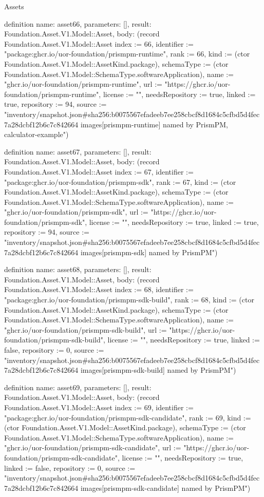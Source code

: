 \begin{lexlean}{Assets}
\begin{semanticmodule}
definition{
  name: asset66,
  parameters: [],
  result: Foundation.Asset.V1.Model::Asset,
  body: (record Foundation.Asset.V1.Model::Asset {index := 66, identifier := "package:ghcr.io/uor-foundation/prismpm-runtime", rank := 66, kind := (ctor Foundation.Asset.V1.Model::AssetKind.package), schemaType := (ctor Foundation.Asset.V1.Model::SchemaType.softwareApplication), name := "ghcr.io/uor-foundation/prismpm-runtime", url := "https://ghcr.io/uor-foundation/prismpm-runtime", license := "", needsRepository := true, linked := true, repository := 94, source := "inventory/snapshot.json#sha256:b0075567efadeeb7ee258cbcf8d1684c5cfbd5d4fec7a28dcbf12b6c7c842664 images[prismpm-runtime] named by PrismPM, calculator-example"})
}

definition{
  name: asset67,
  parameters: [],
  result: Foundation.Asset.V1.Model::Asset,
  body: (record Foundation.Asset.V1.Model::Asset {index := 67, identifier := "package:ghcr.io/uor-foundation/prismpm-sdk", rank := 67, kind := (ctor Foundation.Asset.V1.Model::AssetKind.package), schemaType := (ctor Foundation.Asset.V1.Model::SchemaType.softwareApplication), name := "ghcr.io/uor-foundation/prismpm-sdk", url := "https://ghcr.io/uor-foundation/prismpm-sdk", license := "", needsRepository := true, linked := true, repository := 94, source := "inventory/snapshot.json#sha256:b0075567efadeeb7ee258cbcf8d1684c5cfbd5d4fec7a28dcbf12b6c7c842664 images[prismpm-sdk] named by PrismPM"})
}

definition{
  name: asset68,
  parameters: [],
  result: Foundation.Asset.V1.Model::Asset,
  body: (record Foundation.Asset.V1.Model::Asset {index := 68, identifier := "package:ghcr.io/uor-foundation/prismpm-sdk-build", rank := 68, kind := (ctor Foundation.Asset.V1.Model::AssetKind.package), schemaType := (ctor Foundation.Asset.V1.Model::SchemaType.softwareApplication), name := "ghcr.io/uor-foundation/prismpm-sdk-build", url := "https://ghcr.io/uor-foundation/prismpm-sdk-build", license := "", needsRepository := true, linked := false, repository := 0, source := "inventory/snapshot.json#sha256:b0075567efadeeb7ee258cbcf8d1684c5cfbd5d4fec7a28dcbf12b6c7c842664 images[prismpm-sdk-build] named by PrismPM"})
}

definition{
  name: asset69,
  parameters: [],
  result: Foundation.Asset.V1.Model::Asset,
  body: (record Foundation.Asset.V1.Model::Asset {index := 69, identifier := "package:ghcr.io/uor-foundation/prismpm-sdk-candidate", rank := 69, kind := (ctor Foundation.Asset.V1.Model::AssetKind.package), schemaType := (ctor Foundation.Asset.V1.Model::SchemaType.softwareApplication), name := "ghcr.io/uor-foundation/prismpm-sdk-candidate", url := "https://ghcr.io/uor-foundation/prismpm-sdk-candidate", license := "", needsRepository := true, linked := false, repository := 0, source := "inventory/snapshot.json#sha256:b0075567efadeeb7ee258cbcf8d1684c5cfbd5d4fec7a28dcbf12b6c7c842664 images[prismpm-sdk-candidate] named by PrismPM"})
}


\end{semanticmodule}
\end{lexlean}
